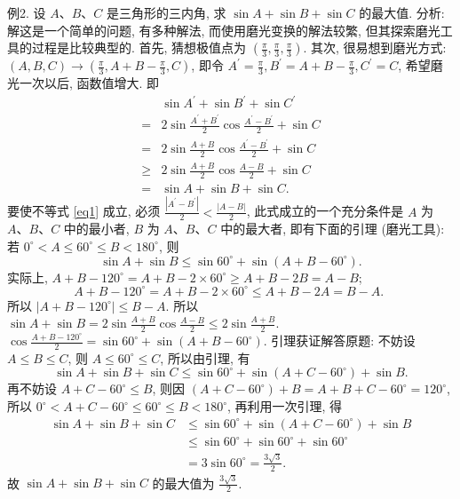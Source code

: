 例2. 设 $A 、 B 、 C$ 是三角形的三内角, 求 $\sin A+\sin B+\sin C$ 的最大值.
分析:解这是一个简单的问题, 有多种解法, 而使用磨光变换的解法较繁, 但其探索磨光工具的过程是比较典型的.
首先, 猜想极值点为 $\left(\frac{\pi}{3}, \frac{\pi}{3}, \frac{\pi}{3}\right)$.
其次, 很易想到磨光方式: $(A, B, C) \rightarrow\left(\frac{\pi}{3}, A+B-\frac{\pi}{3}, C\right)$, 即令 $A^{\prime}=\frac{\pi}{3}, B^{\prime}=A+B-\frac{\pi}{3}, C^{\prime}=C$, 希望磨光一次以后, 函数值增大.
即
$$
\begin{aligned}
& \sin A^{\prime}+\sin B^{\prime}+\sin C^{\prime} \\
= & 2 \sin \frac{A^{\prime}+B^{\prime}}{2} \cos \frac{A^{\prime}-B^{\prime}}{2}+\sin C \\
= & 2 \sin \frac{A+B}{2} \cos \frac{A^{\prime}-B^{\prime}}{2}+\sin C \\
\geqslant & 2 \sin \frac{A+B}{2} \cos \frac{A-B}{2}+\sin C \\
= & \sin A+\sin B+\sin C . \label{eq1}
\end{aligned}
$$
要使不等式 \ref{eq1} 成立, 必须 $\frac{\left|A^{\prime}-B^{\prime}\right|}{2}<\frac{|A-B|}{2}$, 此式成立的一个充分条件是 $A$ 为 $A 、 B 、 C$ 中的最小者, $B$ 为 $A 、 B 、 C$ 中的最大者, 即有下面的引理 (磨光工具): 若 $0^{\circ}<A \leqslant 60^{\circ} \leqslant B<180^{\circ}$, 则
$$
\sin A+\sin B \leqslant \sin 60^{\circ}+\sin \left(A+B-60^{\circ}\right) .
$$
实际上, $A+B-120^{\circ}=A+B-2 \times 60^{\circ} \geqslant A+B-2 B=A-B$;
$$
A+B-120^{\circ}=A+B-2 \times 60^{\circ} \leqslant A+B-2 A=B-A \text {. }
$$
所以 $\left|A+B-120^{\circ}\right| \leqslant B-A$.
所以 $\sin A+\sin B=2 \sin \frac{A+B}{2} \cos \frac{A-B}{2} \leqslant 2 \sin \frac{A+B}{2}$. $\cos \frac{A+B-120^{\circ}}{2}=\sin 60^{\circ}+\sin \left(A+B-60^{\circ}\right)$. 引理获证解答原题: 不妨设 $A \leqslant B \leqslant C$, 则 $A \leqslant 60^{\circ} \leqslant C$, 所以由引理, 有
$$
\sin A+\sin B+\sin C \leqslant \sin 60^{\circ}+\sin \left(A+C-60^{\circ}\right)+\sin B .
$$
再不妨设 $A+C-60^{\circ} \leqslant B$, 则因 $\left(A+C-60^{\circ}\right)+B=A+B+C- 60^{\circ}=120^{\circ}$, 所以 $0^{\circ}<A+C-60^{\circ} \leqslant 60^{\circ} \leqslant B<180^{\circ}$, 再利用一次引理, 得
$$
\begin{aligned}
\sin A+\sin B+\sin C & \leqslant \sin 60^{\circ}+\sin \left(A+C-60^{\circ}\right)+\sin B \\
& \leqslant \sin 60^{\circ}+\sin 60^{\circ}+\sin 60^{\circ} \\
& =3 \sin 60^{\circ}=\frac{3 \sqrt{3}}{2} .
\end{aligned}
$$
故 $\sin A+\sin B+\sin C$ 的最大值为 $\frac{3 \sqrt{3}}{2}$.



